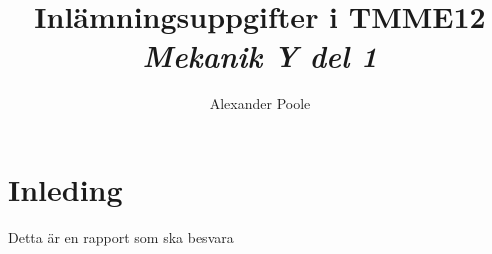 \documentclass[a4paper,12pt]{article}
\title{Inl\"amningsuppgifter i TMME12\\ \emph{Mekanik Y del 1}}
\author{Alexander Poole}
\begin{document}


\section{Inleding}
Detta är en rapport som ska besvara
\end{document}

